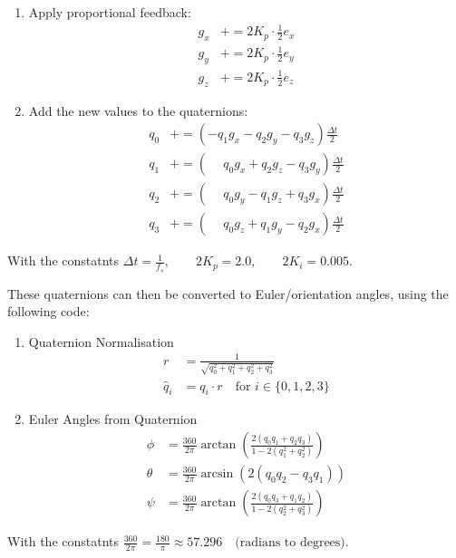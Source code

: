 \documentclass[ti,oneside,10pt]{uantwerpenreport}
\begin{document}
\begin{enumerate}
\begin{align}
            I_z &\mathrel{+}= \frac{2K_i \cdot \tfrac{1}{2}e_z}{f_s} \\
            g_z &\mathrel{+}= I_z
        \end{align}
        With $I$ representing the integral feedback accumulation, and $g$ representing the gyroscope vector.
    \item Apply proportional feedback: 
        \begin{align}
            g_x &\mathrel{+}= 2K_p \cdot \tfrac{1}{2}e_x \\
            g_y &\mathrel{+}= 2K_p \cdot \tfrac{1}{2}e_y \\
            g_z &\mathrel{+}= 2K_p \cdot \tfrac{1}{2}e_z
        \end{align}
    \item Add the new values to the quaternions:
        \begin{align}
            q_0 &\mathrel{+}= \left(-q_1 g_x - q_2 g_y - q_3 g_z\right)\frac{\Delta t}{2} \\
            q_1 &\mathrel{+}= \left(\phantom{-}q_0 g_x + q_2 g_z - q_3 g_y\right)\frac{\Delta t}{2} \\
            q_2 &\mathrel{+}= \left(\phantom{-}q_0 g_y - q_1 g_z + q_3 g_x\right)\frac{\Delta t}{2} \\
            q_3 &\mathrel{+}= \left(\phantom{-}q_0 g_z + q_1 g_y - q_2 g_x\right)\frac{\Delta t}{2}
        \end{align}
\end{enumerate}
With the constatnts $\Delta t = \frac{1}{f_s}, \qquad 2K_p = 2.0, \qquad 2K_i = 0.005$.

These quaternions can then be converted to Euler/orientation angles, using the following code:
\begin{enumerate}
    \item Quaternion Normalisation
        \begin{align}
            r         &= \frac{1}{\sqrt{q_0^2 + q_1^2 + q_2^2 + q_3^2}} \\
            \hat{q}_i &= q_i \cdot r \quad \text{for } i \in \{0, 1, 2, 3\}
        \end{align}
    \item Euler Angles from Quaternion
        \begin{align}
            \phi   &= \frac{360}{2\pi}\arctan\!\left(\frac{2(q_0 q_1 + q_2 q_3)}{1 - 2(q_1^2 + q_2^2)}\right) \\[6pt]
            \theta &= \frac{360}{2\pi}\arcsin\!\left(2(q_0 q_2 - q_3 q_1)\right) \\[6pt]
            \psi   &= \frac{360}{2\pi}\arctan\!\left(\frac{2(q_0 q_3 + q_1 q_2)}{1 - 2(q_2^2 + q_3^2)}\right)
        \end{align}
\end{enumerate}
With the constatnts $\frac{360}{2\pi} = \frac{180}{\pi} \approx 57.296 \quad \text{(radians to degrees)}$.
\end{document}
